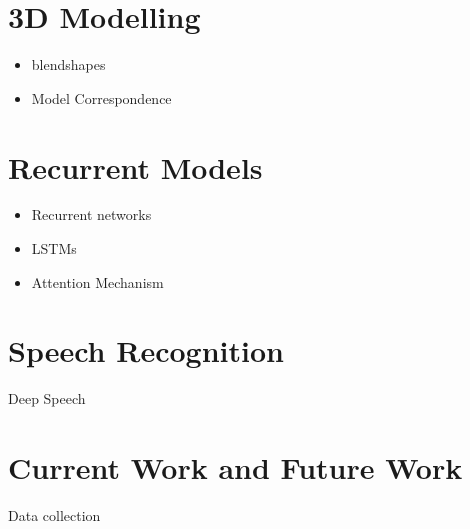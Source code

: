 \documentclass[12pt]{report}
\begin{document}
\chapter{3D Modelling}
\begin{itemize}
    \item blendshapes
    \item Model Correspondence
\end{itemize}

\chapter{Recurrent Models}
\begin{itemize}
    \item Recurrent networks
    \item LSTMs
    \item Attention Mechanism
\end{itemize}


\chapter{Speech Recognition}
Deep Speech \cite{Karras2017a}

\chapter{Current Work and Future Work}
Data collection



\end{document}
